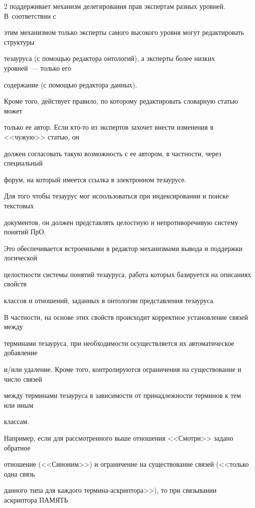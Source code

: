 \begin{multicols}{2}
поддерживает механизм делегирования прав экспертам разных уровней. В~соответствии с 

этим механизмом только эксперты самого высокого уровня могут редактировать структуры 

тезауруса (с помощью редактора онтологий), а эксперты более низких уровней~--- только его 

содержание (с помощью редактора данных).

  

  Кроме того, действует правило, по которому редактировать словарную статью может 

только ее автор. Если кто-то из экспертов захочет внести изменения в <<чужую>> статью, он 

должен согласовать такую возможность с ее автором, в частности, через специальный 

форум, на который имеется ссылка в электронном тезаурусе. 

  

  Для того чтобы тезаурус мог использоваться при индексировании и поиске текстовых 

документов, он должен представлять целостную и непротиворечивую систему понятий ПрО. 

Это обеспечивается встроенными в редактор механизмами вывода и поддержки логической 

целостности системы понятий тезауруса, работа которых базируется на описаниях свойств 

классов и отношений, заданных в онтологии представления тезауруса.

  

  В частности, на основе этих свойств происходит корректное установление связей между 

терминами тезауруса, при необходимости осуществляется их автоматическое добавление 

и/или удаление. Кроме того, контролируются ограничения на существование и число связей 

между терминами тезауруса в зависимости от принадлежности терминов к тем или иным 

классам.

  

  Например, если для рассмотренного выше отношения <<Смотри>> задано обратное 

отношение (<<Синоним>>) и ограничение на существование связей (<<только одна связь 

данного типа для каж\-до\-го тер\-ми\-на-аскрип\-то\-ра>>), то при связывании аскриптора ПАМЯТЬ 


\end{multicols}
